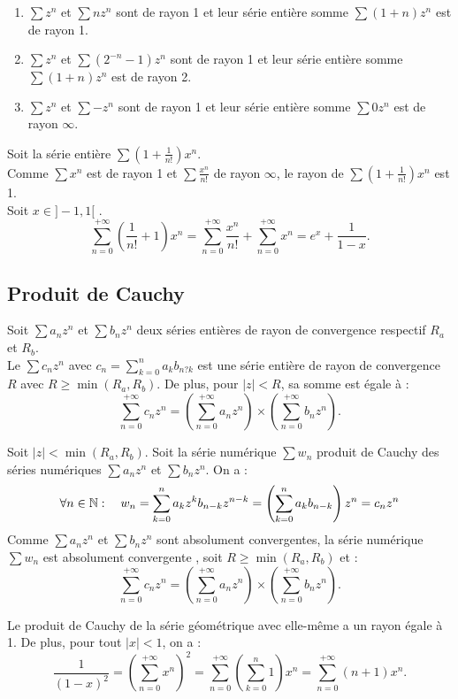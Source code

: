 \documentclass{book}
\begin{document}
\begin{Exemple}
\begin{enumerate}
\item $\sum z^n$ et $\sum nz^n$ sont de rayon 1 et leur série entière somme  $\sum (1+n)z^n$ est de rayon 1.
\item $\sum z^n$ et $\sum (2^{-n}-1)z^n$ sont de rayon 1 et leur série entière somme  $\sum (1+n)z^n$ est de rayon 2.
\item $\sum z^n$ et $\sum -z^n$ sont de rayon 1 et leur série entière somme  $\sum 0z^n$ est de rayon $\infty$.
\end{enumerate} 
\end{Exemple}
\begin{Exemple}
Soit la série entière $\sum (1+\frac{1}{n!})x^n$. \\
Comme $\sum x^n$ est de rayon 1 et  $\sum \frac{x^n}{n!}$ de rayon $\infty$, le rayon de $\sum (1+\frac{1}{n!})x^n$ est 1.\\
Soit $x\in ]-1,1[$ .
$$ \sum_{n=0}^{+\infty} (\frac{1}{n!}+1)x^n= \sum_{n=0}^{+\infty} \frac{x^n}{n!}+ \sum_{n=0}^{+\infty} x^n=e^x+\frac{1}{1-x}.$$
\end{Exemple}
\subsection{Produit de Cauchy}

\begin{Proposition}
Soit $\sum a_n z^n$ et $\sum b_n z^n$ deux séries entières de rayon de convergence respectif $R_a$ et $R_b$.\\
Le  $\sum c_n z^n$  avec $c_n = \sum_{k=0}^n a_k b_{n?k}$ est une série entière de rayon de convergence $R$ avec $R \geq \min( R_a ,R_b )$. De plus, pour $|z|<R$, sa somme est égale à :
$$\sum_{n=0}^{+\infty}c_n z^n = \left(\sum_{n=0}^{+\infty}a_nz^n\right) \times \left(\sum_{n=0}^{+\infty}b_n z^n\right).$$
\end{Proposition}
\begin{Demonstration}
Soit $|z| < \min(R_a,R_b)$. Soit la série numérique $\sum w_n$ produit de Cauchy des séries numériques  $\sum a_n z^n$ et $\sum b_n z^n$. On a :
$$\forall n \in \mathbb{N} : \quad w_n = \sum_{k=0}^n a_k z^k b_{n-k} z^{n-k}=\left(\sum_{k=0}^n a_k  b_{n-k}\right) z^{n}=c_n z^n$$
Comme $\sum a_n z^n$ et $\sum b_n z^n$ sont absolument convergentes, la série numérique $\sum w_n$ est absolument convergente , soit  $R \geq \min( R_a ,R_b )$  et :
 $$\sum_{n=0}^{+\infty}c_n z^n = \left(\sum_{n=0}^{+\infty}a_nz^n\right) \times \left(\sum_{n=0}^{+\infty}b_n z^n\right).$$
\end{Demonstration}
\begin{Exemple}
Le produit de Cauchy de la série géométrique avec elle-même a un rayon égale à 1. De plus, pour tout $|x|<1$, on a :
$$\frac{1}{(1-x)^2}= \left(\sum_{n=0}^{+\infty} x^n\right)^2 =\sum_{n=0}^{+\infty} \left(\sum_{k=0}^n 1\right)x^n =  \sum_{n=0}^{+\infty}(n+1) x^n.$$

\end{Exemple}
\end{document}
